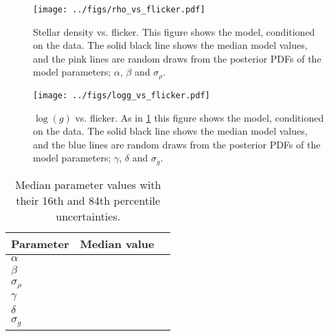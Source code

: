 \begin{figure}
\begin{center}
\texttt{[image: ../figs/rho\_vs\_flicker.pdf]}
\caption{
Stellar density vs. flicker. This figure shows the model, conditioned on the
data. The solid black line shows the median model values, and the pink lines
are random draws from the posterior PDFs of the model parameters; $\alpha$,
$\beta$ and $\sigma_{\rho}$.
}
\label{fig:rhostar}
\end{center}
\end{figure}

\begin{figure}
\begin{center}
\texttt{[image: ../figs/logg\_vs\_flicker.pdf]}
\caption{
$\log(g)$ vs. flicker. As in \ref{fig:rhostar} this figure shows
the model, conditioned on the data. The solid black line shows the median model
values, and the blue lines are random draws from the posterior PDFs of the
model parameters; $\gamma$, $\delta$ and $\sigma_g$.
}
\label{fig:logg}
\end{center}
\end{figure}

\begin{table}
\caption{Median parameter values with their 16th and 84th percentile
	 uncertainties.}
\begin{tabular}{lcc}
\hline\hline
    Parameter & Median value \\
    \hline
    $\alpha$         &   \\
    $\beta$          &   \\
    $\sigma_{\rho}$  &   \\
    $\gamma$         &   \\
    $\delta$         &   \\
    $\sigma_{g}$     &   \\
    \hline
\end{tabular}
\end{table}
